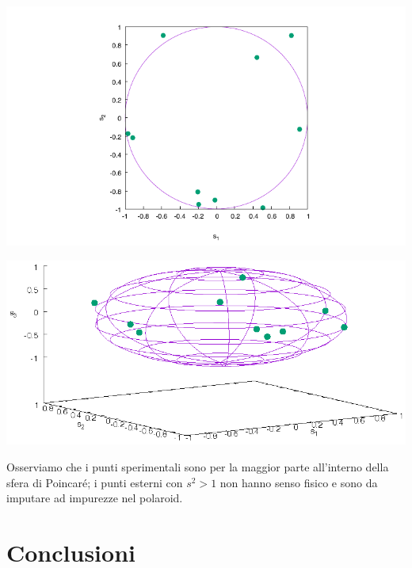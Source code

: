 \documentclass[10pt,oneside,a4paper]{article}
\newenvironment{Figure}
  {\par\medskip\noindent\minipage{\linewidth}}
  {\endminipage\par\medskip}
\begin{document}
\begin{multicols}{2}
\begin{Figure}
	\begin{center}
	\includegraphics[width=\linewidth]{piano}
	\label{fig:piano}
	\end{center}
\end{Figure}
\begin{Figure}
	\begin{center}
	\includegraphics[width=\linewidth]{spazio}
	\label{fig:spazio}
	\end{center}
\end{Figure}

Osserviamo che i punti sperimentali sono per la maggior parte all'interno della sfera di Poincaré; i punti esterni con $s^2>1$ non hanno senso fisico e sono da imputare ad impurezze nel polaroid.



\section{Conclusioni}


\end{multicols}
\end{document}
